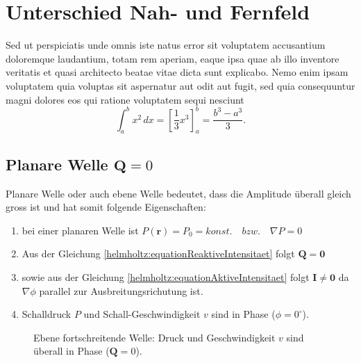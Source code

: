 %
%
%
%
\section{Unterschied Nah- und Fernfeld
\label{helmholtz:section:teil1}}
Sed ut perspiciatis unde omnis iste natus error sit voluptatem
accusantium doloremque laudantium, totam rem aperiam, eaque ipsa
quae ab illo inventore veritatis et quasi architecto beatae vitae
dicta sunt explicabo.
Nemo enim ipsam voluptatem quia voluptas sit aspernatur aut odit
aut fugit, sed quia consequuntur magni dolores eos qui ratione
voluptatem sequi nesciunt
\begin{equation}
\int_a^b x^2\, dx
=
\left[ \frac13 x^3 \right]_a^b
=
\frac{b^3-a^3}3.
\label{helmholtz:equationpaper1}
\end{equation}


\subsection{Planare Welle $\mathbf{Q} = 0$
\label{helmholtz:subsection:planarWelle}}

Planare Welle oder auch ebene Welle bedeutet, dass die Amplitude überall gleich gross ist und hat somit folgende Eigenschaften:

\begin{enumerate}
\item bei einer planaren Welle ist $P (\mathbf{r}) = P_0 = konst.\quad bzw. \quad \nabla P = 0$
\item Aus der Gleichung \eqref{helmholtz:equationReaktiveIntensitaet} folgt $\mathbf{Q} = \mathbf{0}$
\item sowie aus der Gleichung \eqref{helmholtz:equationAktiveIntensitaet} folgt $\mathbf{I} \neq \mathbf{0}$ da $ \nabla \phi$ parallel zur Ausbreitungsrichutung ist.
\item Schalldruck $P$ und Schall-Geschwindigkeit $v$ sind in Phase ($\phi = 0^{\circ}$).
\end{enumerate}

\begin{figure}
\centering
{}
\caption{Ebene fortschreitende Welle: Druck und Geschwindigkeit $v$ sind überall in Phase ($\mathbf Q=0$).}
\end{figure}


